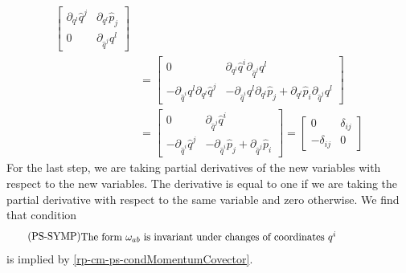 \begin{equation}
\begin{aligned}
		\left[\begin{array}{cc}
			\partial_{q^l} \hat{q}^j & \partial_{q^l} \hat{p}_j \\
			0 & \partial_{\hat{q}^j} q^l 
		\end{array} \right] \\
		&= \left[\begin{array}{cc}
			0 & \partial_{q^l} \hat{q}^i \partial_{\hat{q}^j} q^l   \\
			- \partial_{\hat{q}^i} q^l \partial_{q^l} \hat{q}^j  & 
			- \partial_{\hat{q}^i} q^l \partial_{q^l} \hat{p}_j +  \partial_{q^l} \hat{p}_i \partial_{\hat{q}^j} q^l 
		\end{array} \right] \\
		&= \left[\begin{array}{cc}
			0 & \partial_{\hat{q}^j} \hat{q}^i   \\
			- \partial_{\hat{q}^i} \hat{q}^j  & 
			- \partial_{\hat{q}^i}  \hat{p}_j +  \partial_{\hat{q}^j} \hat{p}_i 
		\end{array} \right] = \left[\begin{array}{cc}
			0 & \delta_{ij} \\
			- \delta_{ij} & 0 
		\end{array} \right]
	\end{aligned}
\end{equation}
For the last step, we are taking partial derivatives of the new variables with respect to the new variables. The derivative is equal to one if we are taking the partial derivative with respect to the same variable and zero otherwise. We find that condition
\begin{equation}
	\tag{PS-SYMP}\label{rp-cm-ps-condInvarianceSF}
	\eqtext{The form $\omega_{ab}$ is invariant under changes of coordinates $q^i$}
\end{equation}
is implied by \ref{rp-cm-ps-condMomentumCovector}.

